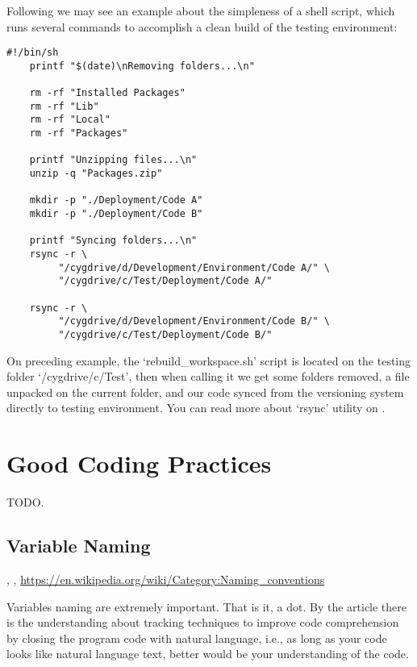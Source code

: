     Following we may see an example about the simpleness of a shell script,
    which runs several commands to accomplish a clean build of the testing
    environment:

    \begin{lstlisting}[caption={rebuild\_workspace.sh}]
    #!/bin/sh
    printf "$(date)\nRemoving folders...\n"

    rm -rf "Installed Packages"
    rm -rf "Lib"
    rm -rf "Local"
    rm -rf "Packages"

    printf "Unzipping files...\n"
    unzip -q "Packages.zip"

    mkdir -p "./Deployment/Code A"
    mkdir -p "./Deployment/Code B"

    printf "Syncing folders...\n"
    rsync -r \
         "/cygdrive/d/Development/Environment/Code A/" \
         "/cygdrive/c/Test/Deployment/Code A/"

    rsync -r \
         "/cygdrive/d/Development/Environment/Code B/" \
         "/cygdrive/c/Test/Deployment/Code B/"
    \end{lstlisting}
    \vspace*{-4mm}

    On preceding example, the `rebuild\_workspace.sh' script is located on the
    testing folder `/cygdrive/c/Test', then when calling it we get some folders
    removed, a file unpacked on the current folder, and our code synced from the
    versioning system directly to testing environment. You can read more about
    `rsync' utility on \citeonline{synchronizingFolders}.



    \section{Good Coding Practices}

    TODO.


    \subsection{Variable Naming}

    \cite{theImpactOfIdentifierStyle},
    \cite{womenAndMen},
    \url{https://en.wikipedia.org/wiki/Category:Naming_conventions}

    Variables naming are extremely important. That is it, a dot. By the article
     there is the understanding about tracking
    techniques to improve code comprehension by closing the program code with
    natural language, i.e., as long as your code looks like natural language
    text, better would be your understanding of the code.

